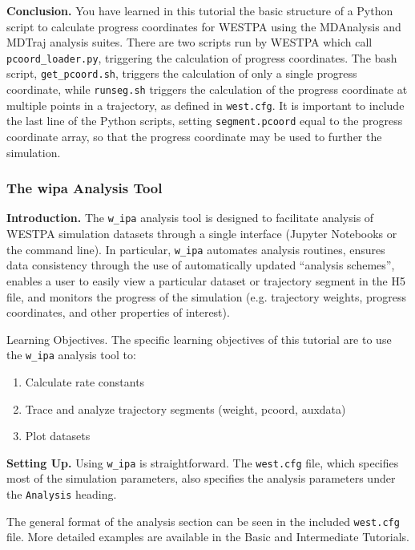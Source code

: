\documentclass[9pt,tutorial,pubversion]{livecoms}
\begin{document}
\textbf{Conclusion.} You have learned in this tutorial the basic structure of a Python script to calculate progress coordinates for WESTPA using the MDAnalysis and MDTraj analysis suites. 
There are two scripts run by WESTPA which call \verb|pcoord_loader.py|, triggering the calculation of progress coordinates. 
The bash script, \verb|get_pcoord.sh|, triggers the calculation of only a single progress coordinate, while \verb|runseg.sh| triggers the calculation of the progress coordinate at multiple points in a trajectory, as defined in \verb|west.cfg|. 
It is important to include the last line of the Python scripts, setting \verb|segment.pcoord| equal to the progress coordinate array, so that the progress coordinate may be used to further the simulation.

\subsubsection{The w\textunderscore ipa Analysis Tool}

\textbf{Introduction.} The \verb|w_ipa| analysis tool is designed to facilitate analysis of WESTPA simulation datasets through a single interface (Jupyter Notebooks or the command line). 
In particular, \verb|w_ipa| automates analysis routines, ensures data consistency through the use of automatically updated “analysis schemes”, enables a user to easily view a particular dataset or trajectory segment in the H5 file, and monitors the progress of the simulation (e.g. trajectory weights, progress coordinates, and other properties of interest).  

Learning Objectives. The specific learning objectives of this tutorial are to use the \verb|w_ipa| analysis tool to:
\begin{enumerate} 
\item Calculate rate constants
\item Trace and analyze trajectory segments (weight, pcoord, auxdata)
\item Plot datasets
\end{enumerate}

\textbf{Setting Up.}  Using \verb|w_ipa| is straightforward. 
The \verb|west.cfg| file, which specifies most of the simulation parameters, also specifies the analysis parameters under the \verb|Analysis| heading.

The general format of the analysis section can be seen in the included \verb|west.cfg| file. 
More detailed examples are available in the Basic and Intermediate Tutorials.
\end{document}

